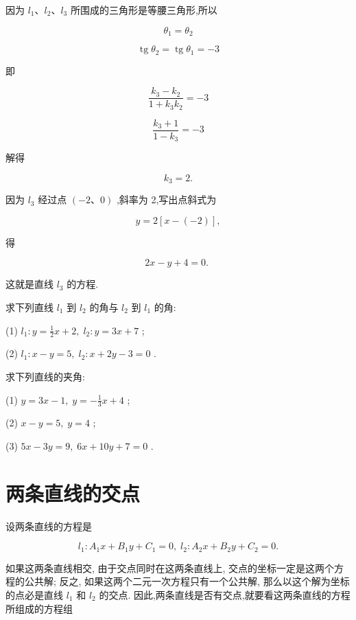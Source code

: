 \documentclass[lang=cn,newtx,10pt,scheme=chinese]{elegantbook}
\begin{document}
因为 \({l}_{1}\text{、}{l}_{2}\text{、}{l}_{3}\) 所围成的三角形是等腰三角形,所以

\[
    {\theta }_{1} = {\theta }_{2}
\]

\[
  \operatorname{tg}{\theta }_{2} = \operatorname{tg}{\theta }_{1} = - 3
\]

即

\[
  \frac{{k}_{3} - {k}_{2}}{1 + {k}_{3}{k}_{2}} = - 3
\]

\[
  \frac{{k}_{3} + 1}{1 - {k}_{3}} = - 3
\]

解得

\[
    {k}_{3} = 2\text{.}
\]

因为 \({l}_{3}\) 经过点 \(\left( {-2\text{、}0}\right)\) ,斜率为 2,写出点斜式为

\[
  y = 2\left\lbrack {x - \left( {-2}\right) }\right\rbrack ,
\]

得

\[
    {2x} - y + 4 = 0\text{. }
\]

这就是直线 \({l}_{3}\) 的方程.

\begin{problemset}[练习]

\item 求下列直线 \({l}_{1}\) 到 \({l}_{2}\) 的角与 \({l}_{2}\) 到 \({l}_{1}\) 的角:

(1) \({l}_{1} : y = \frac{1}{2}x + 2,\;{l}_{2} : y = {3x} + 7\) ;

(2) \({l}_{1} : x - y = 5,\;{l}_{2} : x + {2y} - 3 = 0\) .

\item 求下列直线的夹角:

(1) \(y = {3x} - 1,\;y = - \frac{1}{3}x + 4\) ;

(2) \(x - y = 5,\;y = 4\) ;

(3) \({5x} - {3y} = 9,\;{6x} + {10y} + 7 = 0\) .
\end{problemset}

\section{两条直线的交点}

设两条直线的方程是

\[
    {l}_{1} : {A}_{1}x + {B}_{1}y + {C}_{1} = 0,\;{l}_{2} : {A}_{2}x + {B}_{2}y + {C}_{2} = 0.
\]

如果这两条直线相交, 由于交点同时在这两条直线上, 交点的坐标一定是这两个方程的公共解; 反之, 如果这两个二元一次方程只有一个公共解, 那么以这个解为坐标的点必是直线 \({l}_{1}\) 和 \({l}_{2}\) 的交点. 因此,两条直线是否有交点,就要看这两条直线的方程所组成的方程组
\end{document}
